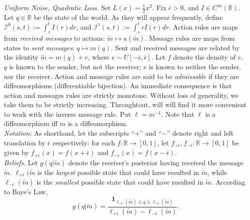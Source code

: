 \documentclass[12pt]{article}
\begin{document}
\noindent\textit{Uniform Noise, Quadratic Loss.} Set $L(x)=\frac{1}{2}x^2$. Fix $\bar{\epsilon}>0$, and $I\in C^{\infty}(\mathbb{R})$. Let $q\in\mathbb{R}$ be the state of the world. As they will appear frequently, define $\mathcal{I}^{0}(s,t):=\int_{s}^{t}{I(r)dr}$, and $\mathcal{I}^{1}(s,t):=\int_{s}^{t}{rI(r)dr}$. Action rules are maps from \textit{received messages} to actions: $\tilde{m}\mapsto a(\tilde{m})$. Message rules are maps from states to \textit{sent messages}: $q\mapsto m(q)$. Sent and received messages are related by the identity $\tilde{m}=m(q)+e$, where $e\sim U[-\bar{\epsilon},\bar{\epsilon}]$. Let $f$ denote the density of $e$. $q$ is known to the sender, but not the receiver; $e$ is known to neither the sender, nor the receiver. Action and message rules are said to be \textit{admissable} if they are diffeomorphisms (differentiable bijection). An immediate consequence is that action and messages rules are strictly monotone. Without loss of generality, we take them to be strictly increasing. Throughtout, will will find it more convenient to work with the inverse message rule. Put $\ell=m^{-1}$. Note that $\ell$ is a diffeomorphism iff $m$ is a diffeomorphism.\\

\noindent\textit{Notation:} As shorthand, let the subscripts ``$+$'' and ``$-$'' denote right and left translation by $\bar{\epsilon}$ respectively: for each $f:\mathbb{R}\rightarrow[0,1]$, let $f_{+\bar{\epsilon}},f_{-\bar{\epsilon}}:\mathbb{R}\rightarrow[0,1]$ be given by $f_{+\bar{\epsilon}}(x)=f(x+\bar{\epsilon})$ and $f_{-\bar{\epsilon}}(x)=f(x-\bar{\epsilon})$. \\

\noindent\textit{Beliefs.} Let $g(q|\tilde{m})$ denote the receiver's posterior having received the message $\tilde{m}$. $\ell_{+\bar{\epsilon}}(\tilde{m}$ is the \textit{largest} possible state that could have resulted in $\tilde{m}$, while $\ell_{-\bar{\epsilon}}(\tilde{m})$ is the \textit{smallest} possible state that could have resulted in $\tilde{m}$. According to Baye's Law,
\begin{equation}
g(q|\tilde{m})=\frac{\mathbf{1}_{\ell_{-\bar{\epsilon}}(\tilde{m})\leq q\leq\ell_{+\bar{\epsilon}}(\tilde{m})}}{\ell_{+\bar{\epsilon}}(\tilde{m})-\ell_{-\bar{\epsilon}}(\tilde{m})}.
\end{equation}
\end{document}
